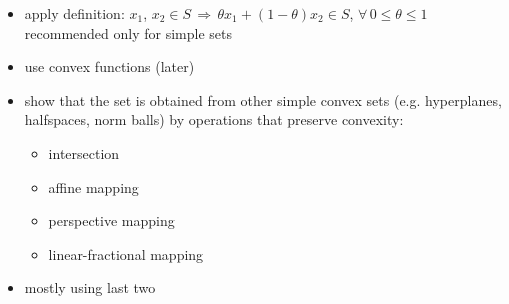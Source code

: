 \documentclass[11pt]{extarticle}
\newcommand{\ie}{\,\Longrightarrow\,}
\theoremstyle{definition}
\begin{document}
\begin{itemize}
  \item apply definition: $x_1$, $x_2\in S\ie \theta x_1 + (1 - \theta)x_2\in S$, $\forall\,0\leqslant\theta\leqslant 1$ \\ recommended only for simple sets
  \item use convex functions (later)
  \item show that the set is obtained from other simple convex sets (e.g. hyperplanes, halfspaces, norm balls) by operations that preserve convexity:
    \begin{itemize}
      \item intersection
      \item affine mapping
      \item perspective mapping
      \item linear-fractional mapping
    \end{itemize}
  \item mostly using last two
\end{itemize}

\newpage
\end{document}
